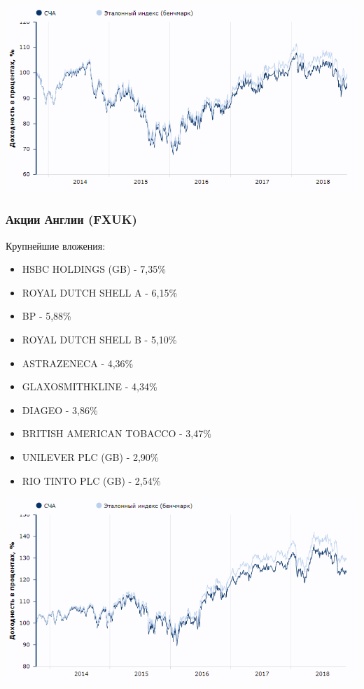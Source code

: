 \includegraphics[width=16cm]{pics/alina/australia.png}

\subsubsection{Акции Англии (FXUK)}

Крупнейшие вложения:

\begin{itemize}
	\item HSBC HOLDINGS (GB) - 7,35\%
	\item ROYAL DUTCH SHELL A - 6,15\%
	\item BP - 5,88\%
	\item ROYAL DUTCH SHELL B - 5,10\%
	\item ASTRAZENECA - 4,36\%
	\item GLAXOSMITHKLINE - 4,34\%
	\item DIAGEO - 3,86\%
	\item BRITISH AMERICAN TOBACCO - 3,47\%
	\item UNILEVER PLC (GB) - 2,90\%
	\item RIO TINTO PLC (GB) - 2,54\%
\end{itemize}

\includegraphics[width=16cm]{pics/alina/uk.png}

